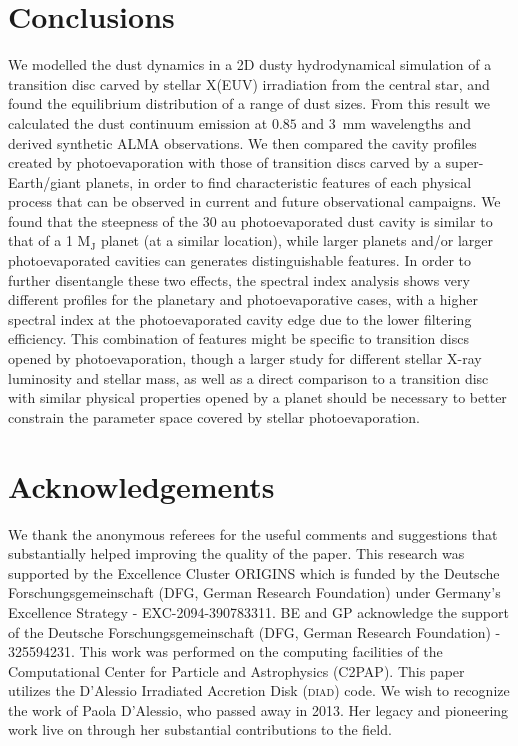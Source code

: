 \documentclass[fleqn,usenatbib]{mnras}
\begin{document}
\section{Conclusions} \label{sec:conclusions}

We modelled the dust dynamics in a 2D dusty hydrodynamical simulation of a transition disc carved by stellar X(EUV) irradiation from the central star, and found the equilibrium distribution of a range of dust sizes.
From this result we calculated the dust continuum emission at $0.85$ and \SI{3}{mm} wavelengths and derived synthetic ALMA observations. We then compared the cavity profiles created by photoevaporation with those of transition discs carved by a super-Earth/giant planets, in order to find characteristic features of each physical process that can be observed in current and future observational campaigns.
We found that the steepness of the 30 au photoevaporated dust cavity is similar to that of a 1 M$_\mathrm{J}$ planet (at a similar location), while larger planets and/or larger photoevaporated cavities can generates distinguishable features.
In order to further disentangle these two effects, the spectral index analysis shows very different profiles for the planetary and photoevaporative cases, with a higher spectral index at the photoevaporated cavity edge due to the lower filtering efficiency.
This combination of features might be specific to transition discs opened by photoevaporation, though a larger study for different stellar X-ray luminosity and stellar mass, as well as a direct comparison to a transition disc with similar physical properties opened by a planet should be necessary to better constrain the parameter space covered by stellar photoevaporation.

\section*{Acknowledgements}
We thank the anonymous referees for the useful comments and suggestions that substantially helped improving the quality of the paper.
This research was supported by the Excellence Cluster ORIGINS which is funded by the Deutsche Forschungsgemeinschaft (DFG, German Research Foundation) under Germany's Excellence Strategy - EXC-2094-390783311. BE and GP acknowledge the support of the Deutsche Forschungsgemeinschaft (DFG, German Research Foundation) - 325594231.
This work was performed on the computing facilities of the Computational Center for Particle and Astrophysics (C2PAP).
This paper utilizes the D'Alessio Irradiated Accretion Disk (\textsc{diad}) code. We wish to recognize the work of Paola D'Alessio, who passed away in 2013. Her legacy and pioneering work live on through her substantial contributions to the field.
\end{document}
